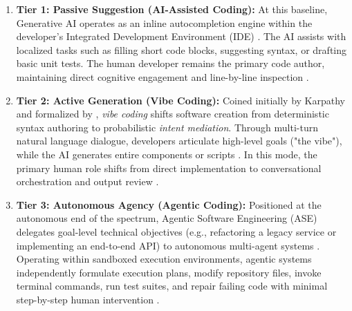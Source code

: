 \documentclass[10pt,a4paper]{article}
\begin{document}
\begin{enumerate}
    \item \textbf{Tier 1: Passive Suggestion (AI-Assisted Coding):} At this baseline, Generative AI operates as an inline autocompletion engine within the developer's Integrated Development Environment (IDE) \parencite{farrag2026, diaz2026}. The AI assists with localized tasks such as filling short code blocks, suggesting syntax, or drafting basic unit tests. The human developer remains the primary code author, maintaining direct cognitive engagement and line-by-line inspection \parencite{diaz2026}.
    
    \item \textbf{Tier 2: Active Generation (Vibe Coding):} Coined initially by Karpathy and formalized by \textcite{meske2025}, \textit{vibe coding} shifts software creation from deterministic syntax authoring to probabilistic \textit{intent mediation}. Through multi-turn natural language dialogue, developers articulate high-level goals ("the vibe"), while the AI generates entire components or scripts \parencite{meske2025, farrag2026}. In this mode, the primary human role shifts from direct implementation to conversational orchestration and output review \parencite{diaz2026, sapkota2025}.
    
    \item \textbf{Tier 3: Autonomous Agency (Agentic Coding):} Positioned at the autonomous end of the spectrum, Agentic Software Engineering (ASE) delegates goal-level technical objectives (e.g., refactoring a legacy service or implementing an end-to-end API) to autonomous multi-agent systems \parencite{sapkota2025, diaz2026}. Operating within sandboxed execution environments, agentic systems independently formulate execution plans, modify repository files, invoke terminal commands, run test suites, and repair failing code with minimal step-by-step human intervention \parencite{sapkota2025, mandl2026}.
\end{enumerate}
\end{document}
